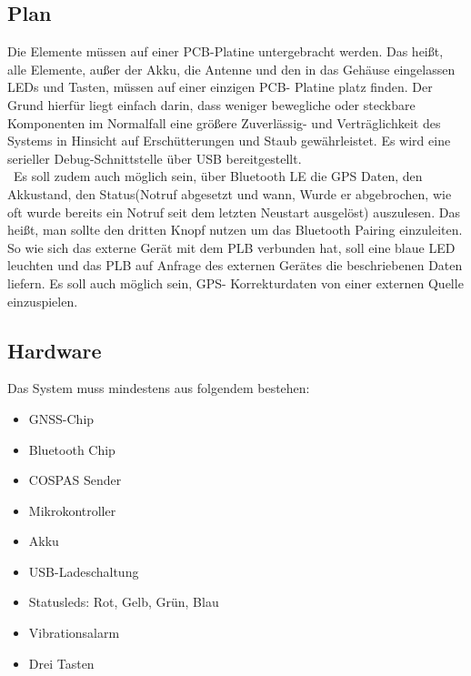 \subsection{Plan}
Die Elemente müssen auf einer PCB-Platine untergebracht werden. Das heißt, alle Elemente, außer der Akku, die Antenne und den in das Gehäuse eingelassen LEDs und Tasten, müssen auf einer einzigen PCB- Platine platz finden. Der Grund hierfür liegt einfach darin, dass weniger bewegliche oder steckbare Komponenten im Normalfall eine größere Zuverlässig- und Verträglichkeit des Systems in Hinsicht auf Erschütterungen und Staub gewährleistet. Es wird eine serieller Debug-Schnittstelle über USB bereitgestellt.\\\
Es soll zudem auch möglich sein, über Bluetooth LE die GPS Daten, den Akkustand, den Status(Notruf abgesetzt und wann, Wurde er abgebrochen, wie oft wurde bereits ein Notruf seit dem letzten Neustart ausgelöst) auszulesen. Das heißt, man sollte den dritten Knopf nutzen um das Bluetooth Pairing einzuleiten. So wie sich das externe Gerät mit dem PLB verbunden hat, soll eine blaue LED leuchten und das PLB auf Anfrage des externen Gerätes die beschriebenen Daten liefern. Es soll auch möglich sein, GPS- Korrekturdaten von einer externen Quelle einzuspielen.

\subsection{Hardware}
Das System muss mindestens aus folgendem bestehen:
\begin{itemize}
	\item GNSS-Chip
	\item Bluetooth Chip
	\item COSPAS Sender
	\item Mikrokontroller
	\item Akku
	\item USB-Ladeschaltung
	\item Statusleds: Rot, Gelb, Grün, Blau 
	\item Vibrationsalarm
	\item Drei Tasten
\end{itemize}

